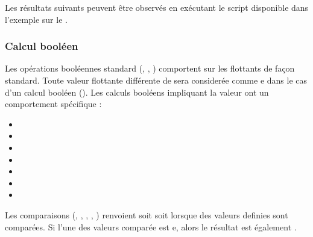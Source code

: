 \documentclass[letterpaper,10pt,french]{sphinxmanual}
\begin{document}
\sphinxAtStartPar
Les résultats suivants peuvent être observés en exécutant le script disponible
dans l’exemple sur le {\hyperref[\detokenize{exemples/valeurs:exemples-valeurs}]{}}.


\subsubsection{Calcul booléen}
\label{\detokenize{syntax:calcul-booleen}}
\sphinxAtStartPar
Les opérations booléennes standard (, , ) comportent sur les
flottants de façon standard.
Toute valeur flottante différente de  sera considerée comme e dans
le cas d’un calcul booléen ().
Les calculs booléens impliquant la valeur  ont un comportement
spécifique :
\begin{itemize}
\item {} 
\sphinxAtStartPar
{}

\item {} 
\sphinxAtStartPar
{}

\item {} 
\sphinxAtStartPar
{}

\item {} 
\sphinxAtStartPar
{}

\item {} 
\sphinxAtStartPar
{}

\item {} 
\sphinxAtStartPar
{}

\item {} 
\sphinxAtStartPar
{}

\end{itemize}

\sphinxAtStartPar
Les comparaisons (\sphinxcode{\sphinxupquote{=}}, \sphinxcode{\sphinxupquote{\textless{}}}, \sphinxcode{\sphinxupquote{\textgreater{}}}, \sphinxcode{\sphinxupquote{\textless{}=}}, \sphinxcode{\sphinxupquote{\textgreater{}=}}) renvoient soit  soit 
lorsque des valeurs definies sont comparées.
Si l’une des valeurs comparée est e, alors le résultat est également
.
\end{document}
